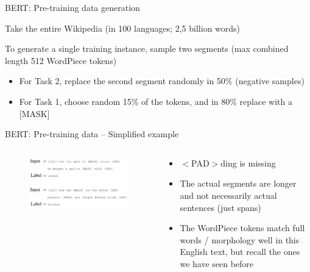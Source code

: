 \documentclass[12pt,aspectratio=169,handout]{beamer}
\begin{document}
\begin{frame}{BERT: Pre-training data generation}
	
	Take the entire Wikipedia (in 100 languages; 2,5 billion words)
	
	To generate a single training instance, sample two segments (max combined length 512 WordPiece tokens)
	
	\begin{itemize}
		\item For Task 2, replace the second segment randomly in 50\% (negative samples)
		\item For Task 1, choose random 15\% of the tokens, and in 80\% replace with a [MASK] 
	\end{itemize}
	
	
\end{frame}


\begin{frame}{BERT: Pre-training data -- Simplified example}
	
	\begin{columns}
		\begin{column}{0.5\linewidth}
			\begin{figure}
				\includegraphics[width=\linewidth]{img/bert-pretraining2.png}
			\end{figure}
		\end{column}
		\begin{column}{0.5\linewidth}
			\begin{small}
				
				\begin{itemize}
					\item $<$PAD$>$ding is missing
					\item The actual segments are longer and not necessarily actual sentences (just spans)
					\item The WordPiece tokens match full words / morphology well in this English text, but recall the ones we have seen before
				\end{itemize}
			\end{small}
		\end{column}
	\end{columns}
	
	
\end{frame}
\end{document}
